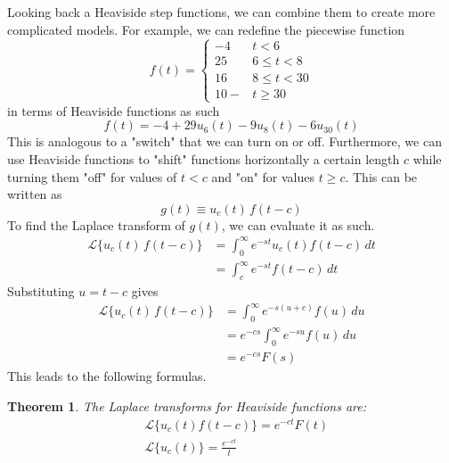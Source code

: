 \documentclass{article}
\newtheorem{theorem}{Theorem}[section]
\theoremstyle{remark}
\theoremstyle{definition}
\begin{document}
Looking back a Heaviside step functions, we can combine them to create more complicated models. For example, we can redefine the piecewise function
\[f(t) = \begin{cases}
-4 & t < 6 \\
25 & 6 \leq t < 8 \\
16 & 8 \leq t < 30 \\
10- & t \geq 30
\end{cases}\]
in terms of Heaviside functions as such
\[f(t) = -4 + 29 u_6 (t) - 9 u_8 (t) - 6 u_{30} (t)\]
This is analogous to a "switch" that we can turn on or off. Furthermore, we can use Heaviside functions to "shift" functions horizontally a certain length $c$ while turning them "off" for values of $t < c$ and "on" for values $t \geq c$. This can be written as 
\[g(t) \equiv u_c (t) \, f(t - c)\]
To find the Laplace transform of $g(t)$, we can evaluate it as such. 
\begin{align*}
    \mathcal{L} \{u_c (t) \, f(t -c)\} & = \int_0^\infty e^{-s t} u_c (t) f(t-c) \,dt \\
    & = \int_c^\infty e^{-st} f(t-c) \,dt 
\end{align*}
Substituting $u = t - c$ gives
\begin{align*}
     \mathcal{L} \{u_c (t) \, f(t -c)\} & = \int_0^\infty e^{-s (u+c)} f(u) \,du \\
     & = e^{-cs} \int_0^\infty e^{-su} f(u)\,du \\
     & = e^{-cs} F(s)
\end{align*}
This leads to the following formulas. 
\begin{theorem}
The Laplace transforms for Heaviside functions are:
\begin{align*}
    & \mathcal{L} \{u_c (t) f(t-c)\} = e^{-ct} F(t) \\
    & \mathcal{L} \{u_c (t)\} = \frac{e^{-ct}}{t}
\end{align*}
\end{theorem}
\end{document}
